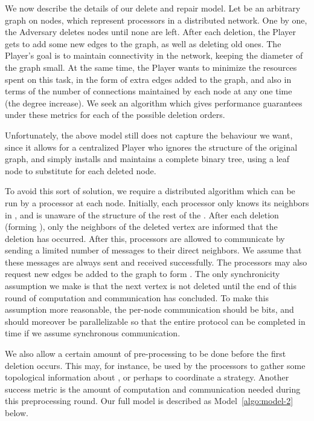 \documentclass[11pt]{article}
\begin{document}
We now describe the details of our delete and repair model.  Let  be an arbitrary graph on  nodes,
which represent processors in a distributed network.  One by one, the Adversary deletes nodes until none are left.  After each deletion, the Player gets to add some new edges to the graph, as well as deleting old ones.   The Player's goal is to maintain connectivity in the network, keeping the diameter of the graph small.  At the same time, the Player wants to minimize the resources spent on this task,
in the form of extra edges added to the graph, and also in 
terms of the number of connections maintained by each node
at any one time (the degree increase).  We seek an algorithm which gives performance guarantees 
under these metrics for each of the  possible deletion orders.

Unfortunately, the above model still does not capture the
behaviour we want, since it allows for a centralized Player
who ignores the structure of the original graph, and simply
installs and maintains a complete binary tree, using a leaf 
node to substitute for each deleted node. 



To avoid this sort of solution, we require a distributed
algorithm which can be run by a processor at each node.
Initially, each processor only knows its neighbors in ,
and is unaware of the structure of the rest of the .
After each deletion (forming ), only the neighbors of the deleted
vertex are informed that the deletion has occurred.
After this, processors are allowed to communicate by
sending a limited number of messages to their direct 
neighbors.  We assume that these messages are always
sent and received successfully.  The processors may 
also request new edges be added to the graph to form .
The only synchronicity assumption we make is that the
next vertex is not deleted until the end of this round
of computation and communication has concluded.
To make this assumption more reasonable, the per-node
communication should be  bits, and should 
moreover be parallelizable so that the entire protocol
can be completed in  time if we assume synchronous
communication.

We also allow a certain amount of pre-processing to be
done before the first deletion occurs.  This may, for
instance, be used by the processors to gather some
topological information about , or perhaps to 
coordinate a strategy.  Another success metric is
the amount of computation and communication needed
during this preprocessing round.  Our full model is described as Model~\ref{algo:model-2} below.
\end{document}
